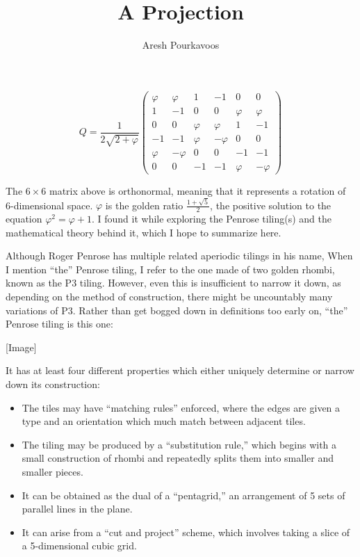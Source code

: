 \documentclass{article}
\begin{document}
\title{A Projection}
\author{Aresh Pourkavoos}
\maketitle

\[
Q =
\frac{1}{2\sqrt{2+\varphi}}
\begin{pmatrix}
  \varphi & \varphi & 1 & -1 & 0 & 0 \\
  1 & -1 & 0 & 0 & \varphi & \varphi \\
  0 & 0 & \varphi & \varphi & 1 & -1 \\
  -1 & -1 & \varphi & -\varphi & 0 & 0 \\
  \varphi & -\varphi & 0 & 0 & -1 & -1 \\
  0 & 0 & -1 & -1 & \varphi & -\varphi
\end{pmatrix}
\]

The $6 \times 6$ matrix above is orthonormal,
meaning that it represents a rotation of 6-dimensional space.
$\varphi$ is the golden ratio $\frac{1+\sqrt{5}}{2}$,
the positive solution to the equation $\varphi^2 = \varphi+1$.
I found it while exploring the Penrose tiling(s)
and the mathematical theory behind it,
which I hope to summarize here.

Although Roger Penrose has multiple related aperiodic tilings in his name,
When I mention ``the'' Penrose tiling, I refer to the one made of two golden rhombi,
known as the P3 tiling.
However, even this is insufficient to narrow it down,
as depending on the method of construction,
there might be uncountably many variations of P3.
Rather than get bogged down in definitions too early on,
``the'' Penrose tiling is this one:

[Image]

It has at least four different properties
which either uniquely determine or narrow down its construction:
\begin{itemize}
\item
  The tiles may have ``matching rules'' enforced,
  where the edges are given a type and an orientation
  which much match between adjacent tiles.
\item
  The tiling may be produced by a ``substitution rule,''
  which begins with a small construction of rhombi
  and repeatedly splits them into smaller and smaller pieces.
\item
  It can be obtained as the dual of a ``pentagrid,''
  an arrangement of 5 sets of parallel lines in the plane.
\item
  It can arise from a ``cut and project'' scheme,
  which involves taking a slice of a 5-dimensional cubic grid.
\end{itemize}
\end{document}
